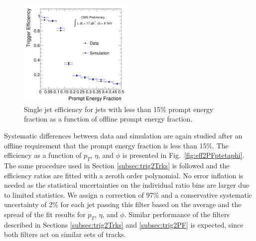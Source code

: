 \begin{figure}[htbp]
\centering
 \includegraphics[width=0.49\textwidth]{plots/trigger/effHT300_PF_PromptEnergyFrac.pdf}
\caption{Single jet efficiency for jets with less than 15\% prompt energy fraction as a function of offline prompt energy fraction. \label{fig:eff2PF}}
\end{figure}     

Systematic differences between data and simulation are again studied after an offline requirement
that the prompt energy fraction is less than 15\%.
 The efficiency as a function of $p_T$, $\eta$, and $\phi$ is presented in Fig.~\ref{fig:eff2PFptetaphi}. 
The same procedure used in Section 
\ref{subsec:trig2Trks} is followed and the efficiency ratios are fitted with a zeroth order polynomial.
 No error inflation is needed as the statistical uncertainties on the individual ratio bins are larger
due to limited statistics.
 We assign a correction of 97\% and a conservative systematic uncertainty of 2\% for
each jet passing this filter based on the average and the spread of the fit results for $p_T$, $\eta$, and $\phi$.
Similar performance of the filters described in Sections \ref{subsec:trig2Trks} and \ref{subsec:trig2PF} 
is expected, since both filters act on similar sets of tracks.

